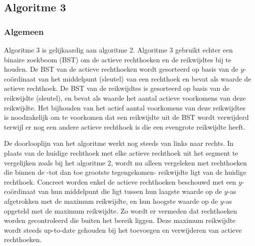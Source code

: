 \documentclass{article}
\begin{document}
\newpage
\subsection{Algoritme 3}
\subsubsection{Algemeen}
\label{algo3_1}
Algoritme 3 is gelijkaardig aan algoritme 2. Algoritme 3 gebruikt echter een binaire zoekboom (BST) om de actieve rechthoeken en de reikwijdtes bij te houden. De BST van de actieve rechthoeken wordt gesorteerd op basis van de $y$-co\"ordinaat van het middelpunt (sleutel) van een rechthoek en bevat als waarde de actieve rechthoek. De BST van de reikwijdtes is gesorteerd op basis van de reikwijdte (sleutel), en bevat als waarde het aantal actieve voorkomens van deze reikwijdte. Het bijhouden van het actief aantal voorkomens van deze reikwijdtes is noodzakelijk om te voorkomen dat een reikwijdte uit de BST wordt verwijderd terwijl er nog een andere actieve rechthoek is die een evengrote reikwijdte heeft.

De doorlooplijn van het algoritme werkt nog steeds van links naar rechts. In plaats van de huidige rechthoek met elke actieve rechthoek uit het segment te vergelijken zoals bij het algoritme 2, wordt nu alleen vergeleken met rechthoeken die binnen de -tot dan toe grootste tegengekomen- reikwijdte ligt van de huidige rechthoek. Concreet worden enkel de actieve rechthoeken beschouwd met een $y$-co\"ordinaat van hun middelpunt die ligt tussen hun laagste waarde op de $y$-as afgetrokken met de maximum reikwijdte, en hun hoogste waarde op de $y$-as opgeteld met de maximum reikwijdte. Zo wordt er vermeden dat rechthoeken worden gecontroleerd die buiten het bereik liggen. Deze maximum reikwijdte wordt steeds up-to-date gehouden bij het toevoegen en verwijderen van actieve rechthoeken.
\end{document}
